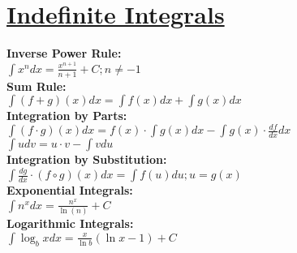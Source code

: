 \documentclass[12pt]{article}
\begin{document}
\section*{\underline{\textbf{Indefinite Integrals}}}
\textbf{Inverse Power Rule:}
    \\ \( \displaystyle\int {x^n dx} = \displaystyle\frac{ x^{n + 1} }{ n + 1 } + C ; n \ne -1 \)
\\ \textbf{Sum Rule:}
    \\ \( \displaystyle\int {(f + g)(x) dx} = \displaystyle\int {f(x) dx} + \displaystyle\int {g(x) dx} \)
\\ \textbf{Integration by Parts:}
    \\ \( \displaystyle\int {(f \cdot g)(x) dx} = f(x) \cdot \displaystyle\int {g(x) dx} - \int {g(x) \cdot \frac{ df }{ dx } dx} \)
    \\ \( \displaystyle\int {u dv} = u \cdot v - \displaystyle\int {v du} \)
\\ \textbf{Integration by Substitution:}
    \\ \( \displaystyle\int {\displaystyle\frac{ dg }{ dx } \cdot (f \circ g)(x) dx} = \displaystyle\int {f(u) du} ; u = g(x) \)
\\ \textbf{Exponential Integrals:}
    \\ \( \displaystyle\int {n^x dx} = \displaystyle\frac{ n^x }{ \ln(n) } + C \)
\\ \textbf{Logarithmic Integrals:}
    \\ \( \displaystyle\int {\log_b{x} dx} = \displaystyle\frac{ x }{ \ln b } (\ln x - 1) + C \)
\end{document}

